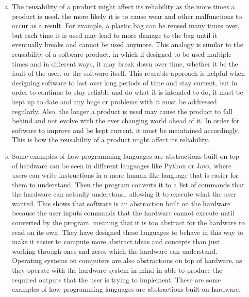 \documentclass[12pt]{article}
\begin{document}
\begin{enumerate}[(a)]
\item The reusability of a product might affect its reliability as the more times 
a product is used, the more likely it is to cause wear and other malfunctions 
to occur as a result. For example, a plastic bag can be reused many times over, 
but each time it is used may lead to more damage to the bag until it eventually 
breaks and cannot be used anymore. This analogy is similar to the reusability 
of a software product, in which if designed to be used multiple times and in 
different ways, it may break down over time, whether it be the fault of the 
user, or the software itself. This reusable approach is helpful when designing 
software to last over long periods of time and stay current, but in order to 
continue to stay reliable and do what it is intended to do, it must be kept 
up to date and any bugs or problems with it must be addressed regularly. Also, 
the longer a product is used may cause the product to fall behind and not evolve 
with the ever changing world ahead of it. In order for software to improve and be 
kept current, it must be maintained accordingly. This is how the reusability of a 
product might affect its reliability. 

\item Some examples of how programming languages are abstractions built on top 
of hardware  can be seen in different languages like Python or Java, where users 
can write instructions in a more human-like language that is easier for them 
to understand. Then the program converts it to a list of commands that the 
hardware can actually understand, allowing it to execute what the user wanted. 
This shows that software is an abstraction built on the hardware because the 
user inputs commands that the hardware cannot execute until converted by the 
program, meaning that it is too abstract for the hardware to read on its own. 
They have designed these languages to behave in this way to make it easier to 
compute more abstract ideas and concepts than just working through ones and zeros 
which the hardware can understand. Operating systems on computers are also 
abstractions on top of hardware, as they operate with the hardware system in 
mind in able to produce the required outputs that the user is trying to 
implement. These are some examples of how programming languages are abstractions 
built on hardware. 

\end{enumerate}

\newpage

\lstset{language=Python, basicstyle=\tiny, breaklines=true, showspaces=false,
  showstringspaces=false, breakatwhitespace=true}
\end{document}

